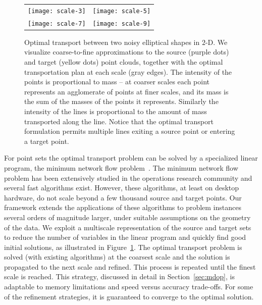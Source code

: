 \documentclass[twoside,11pt]{article}
\begin{document}
\begin{figure}[!b]
\centering
\begin{tabular}{cc}
\texttt{[image: scale-3]} &
\texttt{[image: scale-5]} \\
\texttt{[image: scale-7]} &
\texttt{[image: scale-9]} 
\end{tabular}
\caption{\label{fig:multiscale-strategy}
  Optimal transport between two noisy elliptical shapes in $2$-D. We
visualize coarse-to-fine approximations to the source (purple dots) and target
(yellow dots) point clouds, together with the optimal transportation plan at
each scale (gray edges). The intensity of the points is proportional to mass
-- at coarser scales each point represents an agglomerate of points at finer
scales, and its mass is the sum of the masses of the points it represents.
Similarly the intensity of the lines is proportional to the amount of mass
transported along the line. Notice that the optimal transport formulation
permits multiple lines exiting a source point or entering a target point.}
\end{figure}
For point sets the optimal transport problem can be solved by a specialized
linear program, the minimum network flow
problem~\citep{Ahuja:1993:NFT:137406,Tarjan1997}. The minimum network flow
problem has been extensively studied in the operations research community and
several fast algorithms exist. However, these algorithms, at least on desktop
hardware, do not scale beyond a few thousand source and target points.  Our
framework extends the applications of these algorithms to problem instances
several orders of magnitude larger, under suitable assumptions on the geometry
of the data.  We exploit a multiscale representation of the source and target
sets to reduce the number of variables in the linear program and quickly find
good initial solutions, as illustrated in Figure~\ref{fig:multiscale-strategy}.
The optimal transport problem is solved (with existing algorithms) at the
coarsest scale and the solution is propagated to the next scale and refined.
This process is repeated until the finest scale is reached. This strategy,
discussed in detail in Section~\ref{sec:mdop}, is adaptable to memory
limitations and speed versus accuracy trade-offs. For some of the refinement
strategies, it is guaranteed to converge to the optimal solution.
\end{document}
